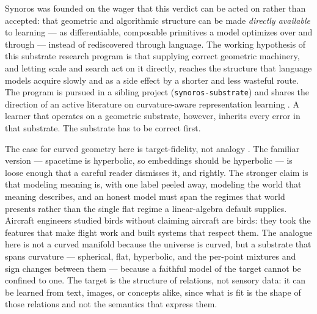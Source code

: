 \documentclass{article}
\newcommand{\code}[1]{\texttt{#1}}
\begin{document}
Synoros was founded on the wager that this verdict can be acted on
rather than accepted: that geometric and algorithmic structure can be
made \emph{directly available} to learning --- as differentiable,
composable primitives a model optimizes over and through --- instead of
rediscovered through language. The working hypothesis of this substrate
research program is that supplying correct geometric machinery, and
letting scale and search act on it directly, reaches the structure that
language models acquire slowly and as a side effect by a shorter and
less wasteful route. The program is pursued in a sibling
project (\code{synoros-substrate}) and shares the direction of an active
literature on curvature-aware representation learning
\citep{nickel2017poincare,gu2019learning,bachmann2020constant,digiovanni2022heterogeneous,guo2025graphmore}.
A learner that operates on a geometric substrate, however, inherits
every error in that substrate. The substrate has to be correct first.

The case for curved geometry here is target-fidelity, not analogy
\citep{vaught2026afteruniverse}. The familiar version --- spacetime is
hyperbolic, so embeddings should be hyperbolic --- is loose enough that a
careful reader dismisses it, and rightly. The stronger claim is that modeling meaning is, with one label
peeled away, modeling the world that meaning describes, and an honest
model must span the regimes that world presents rather than the single
flat regime a linear-algebra default supplies. Aircraft engineers studied
birds without claiming aircraft are birds: they took the features that
make flight work and built systems that respect them. The analogue here
is not a curved manifold because the universe is curved, but a substrate
that spans curvature --- spherical, flat, hyperbolic, and the per-point
mixtures and sign changes between them --- because a faithful model of
the target cannot be confined to one. The target is the structure of
relations, not sensory data: it can be learned from text, images, or
concepts alike, since what is fit is the shape of those relations and not
the semantics that express them.
\end{document}
